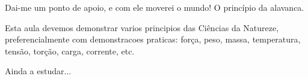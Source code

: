 Dai-me um ponto de apoio, e com ele moverei o mundo! O princípio da alavanca.

Esta aula devemos demonstrar varios principios das Ciências da Natureze, preferencialmente com demonstracoes praticas: força, peso, massa, temperatura, tensão, torção, carga, corrente, etc.

Ainda a estudar...